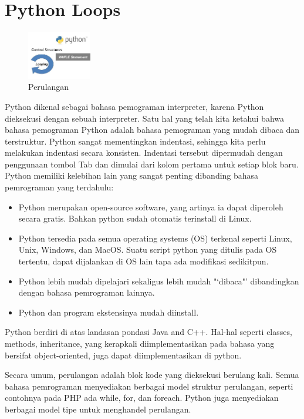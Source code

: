 \section{Python Loops}
\begin{figure}[ht]
	\centerline{\includegraphics[width=0.25\textwidth]{figures/perulangan}}
	\caption{Perulangan}
	\label{perulangan}
\end{figure}
Python dikenal sebagai bahasa pemograman interpreter, karena Python dieksekusi dengan sebuah interpreter. Satu hal yang telah kita ketahui bahwa bahasa pemograman Python adalah bahasa pemograman yang mudah dibaca dan terstruktur. Python sangat mementingkan indentasi, sehingga kita perlu melakukan indentasi secara konsisten. Indentasi tersebut dipermudah dengan penggunaan tombol Tab dan dimulai dari kolom pertama untuk setiap blok baru\cite{santoso2009bahasa}.
Python memiliki kelebihan lain yang sangat penting dibanding bahasa pemrograman yang terdahulu:
\begin{itemize}
\item Python merupakan open-source software, yang artinya ia dapat diperoleh secara gratis. Bahkan python sudah otomatis terinstall di Linux.
\item Python tersedia pada semua operating systems (OS) terkenal seperti Linux, Unix, Windows, dan MacOS. Suatu script python yang ditulis pada OS tertentu, dapat dijalankan di OS lain tapa ada modifikasi sedikitpun.
\item Python lebih mudah dipelajari sekaligus lebih mudah "‘dibaca"’ dibandingkan dengan bahasa pemrograman lainnya.
\item Python dan program ekstensinya mudah diinstall.
\end{itemize}
Python berdiri di atas landasan pondasi Java and C++. Hal-hal seperti classes, methods, inheritance, yang kerapkali diimplementasikan pada bahasa yang bersifat object-oriented, juga dapat diimplementasikan di python.\cite{suparno2013komputasi}

Secara umum, perulangan adalah blok kode yang dieksekusi berulang kali. Semua bahasa pemrograman menyediakan berbagai model struktur perulangan, seperti contohnya pada PHP ada while, for, dan foreach. Python juga menyediakan berbagai model tipe untuk menghandel perulangan. \par


